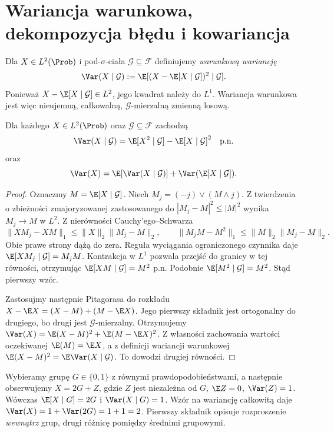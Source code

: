 \section{Wariancja warunkowa, dekompozycja błędu i kowariancja}

\begin{definicja}
Dla $X\in L^2(\Prob)$ i pod-$\sigma$-ciała
$\mathcal G\subseteq\mathcal F$ definiujemy
\emph{warunkową wariancję}
\[
\Var(X\mid\mathcal G)
:=\E[(X-\E[X\mid\mathcal G])^2\mid\mathcal G].
\]
Ponieważ $X-\E[X\mid\mathcal G]\in L^2$,
jego kwadrat należy do $L^1$. Wariancja warunkowa
jest więc nieujemną, całkowalną,
$\mathcal G$-mierzalną zmienną losową.
\end{definicja}

\begin{twierdzenie}
Dla każdego $X\in L^2(\Prob)$ oraz
$\mathcal G\subseteq\mathcal F$ zachodzą
\[
\Var(X\mid\mathcal G)=
\E[X^2\mid\mathcal G]-\E[X\mid\mathcal G]^2
\quad\text{p.n.}
\]
oraz
\[
\Var(X)=\E[\Var(X\mid\mathcal G)]
+\Var(\E[X\mid\mathcal G]).
\]
\end{twierdzenie}
\begin{proof}
Oznaczmy $M=\E[X\mid\mathcal G]$.
Niech $M_j=(-j)\vee(M\wedge j)$. Z twierdzenia
o zbieżności zmajoryzowanej zastosowanego do
$|M_j-M|^2\leq |M|^2$ wynika $M_j\to M$ w $L^2$.
Z nierówności Cauchy'ego--Schwarza
\[
\|XM_j-XM\|_1\leq\|X\|_2\|M_j-M\|_2,\qquad
\|M_jM-M^2\|_1\leq\|M\|_2\|M_j-M\|_2.
\]
Obie prawe strony dążą do zera. Reguła wyciągania
ograniczonego czynnika daje $\E[XM_j\mid\mathcal G]=M_jM$.
Kontrakcja w $L^1$ pozwala przejść do granicy w tej
równości, otrzymując
$\E[XM\mid\mathcal G]=M^2$ p.n.
Podobnie $\E[M^2\mid\mathcal G]=M^2$.
Stąd pierwszy wzór.

Zastosujmy następnie Pitagorasa do rozkładu
$X-\E X=(X-M)+(M-\E X)$.
Jego pierwszy składnik jest ortogonalny do
drugiego, bo drugi jest $\mathcal G$-mierzalny.
Otrzymujemy
$\Var(X)=\E(X-M)^2+\E(M-\E X)^2$.
Z własności zachowania wartości oczekiwanej
$\E(M)=\E X$, a z definicji wariancji
warunkowej $\E(X-M)^2=\E\Var(X\mid\mathcal G)$.
To dowodzi drugiej równości.
\end{proof}

\begin{przyklad}
Wybieramy grupę $G\in\{0,1\}$ z równymi
prawdopodobieństwami, a następnie obserwujemy
$X=2G+Z$, gdzie $Z$ jest niezależna od $G$,
$\E Z=0$, $\Var(Z)=1$. Wówczas
$\E[X\mid G]=2G$ i
$\Var(X\mid G)=1$. Wzór na wariancję całkowitą
daje $\Var(X)=1+\Var(2G)=1+1=2$.
Pierwszy składnik opisuje rozproszenie \emph{wewnątrz}
grup, drugi różnicę pomiędzy średnimi grupowymi.
\end{przyklad}

